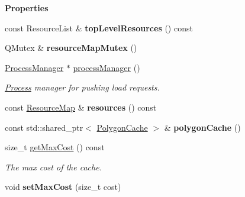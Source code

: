 \begin{Indent}\textbf{ Properties}\par
\begin{DoxyCompactItemize}
\item 
\mbox{\label{classrev_1_1_resource_cache_afabc839a82b2487aa70cda5f5c533aff}} 
const Resource\+List \& {\bfseries top\+Level\+Resources} () const
\item 
\mbox{\label{classrev_1_1_resource_cache_a72dd4fc324d1fb4eb76f91605a91ea33}} 
Q\+Mutex \& {\bfseries resource\+Map\+Mutex} ()
\item 
\mbox{\label{classrev_1_1_resource_cache_a375d3dd14e3d469e93005b9e059c8a89}} 
\mbox{\hyperlink{classrev_1_1_process_manager}{Process\+Manager}} $\ast$ \mbox{\hyperlink{classrev_1_1_resource_cache_a375d3dd14e3d469e93005b9e059c8a89}{process\+Manager}} ()
\begin{DoxyCompactList}\small\item\em \mbox{\hyperlink{classrev_1_1_process}{Process}} manager for pushing load requests. \end{DoxyCompactList}\item 
\mbox{\label{classrev_1_1_resource_cache_a6619ed989863f007ed31af50f93ee17b}} 
const \mbox{\hyperlink{classrev_1_1_threaded_map}{Resource\+Map}} \& {\bfseries resources} () const
\item 
\mbox{\label{classrev_1_1_resource_cache_a74abc6fbfd69f13eda21aa3e4214afc9}} 
const std\+::shared\+\_\+ptr$<$ \mbox{\hyperlink{classrev_1_1_polygon_cache}{Polygon\+Cache}} $>$ \& {\bfseries polygon\+Cache} ()
\item 
\mbox{\label{classrev_1_1_resource_cache_a3f740cd92338f7c4243b46c2a4b6fdc1}} 
size\+\_\+t \mbox{\hyperlink{classrev_1_1_resource_cache_a3f740cd92338f7c4243b46c2a4b6fdc1}{get\+Max\+Cost}} () const
\begin{DoxyCompactList}\small\item\em The max cost of the cache. \end{DoxyCompactList}\item 
\mbox{\label{classrev_1_1_resource_cache_a0fff35652c17159635226dc24538f608}} 
void {\bfseries set\+Max\+Cost} (size\+\_\+t cost)
\end{DoxyCompactItemize}
\end{Indent}
